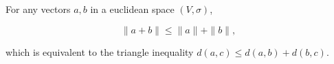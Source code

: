 For any vectors $a, b$ in a euclidean space $(V, \sigma)$,

$$\|a + b\| \leq \|a\| + \|b\|,$$

which is equivalent to the triangle inequality $d(a, c) \leq d(a, b) + d(b, c)$.
